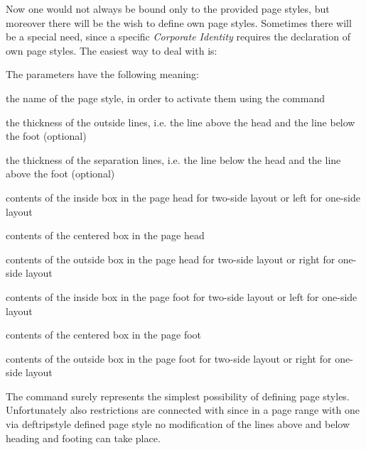 Now one would not always be bound only to the provided page styles,
but moreover there will be the wish to define own page styles.
Sometimes there will be a special need, since a specific
\emph{Corporate Identity} requires the declaration of own page styles.
The easiest way to deal with is:
\begin{Declaration}
%
%
%
\end{Declaration}%
The parameters have the following meaning:
\begin{labeling}[\,--]{}
\item[\PName{name}] the name of the page style, in order to activate them
        using the command 
\item[\PName{LO}] the thickness of the outside lines,
        i.e. the line above the head
        and the line below the foot (optional)
\item[\PName{LI}] the thickness of the separation lines,
        i.e. the line below the head
        and the line above the foot (optional)
\item[\PName{HI}] contents of the inside box in the page head for two-side
        layout or left for one-side layout
\item[\PName{HC}] contents of the centered box in the page head
\item[\PName{HO}] contents of the outside box in the page head for two-side
        layout or right for one-side layout
\item[\PName{FI}] contents of the inside box in the page foot for two-side
        layout or left for one-side layout
\item[\PName{FC}] contents of the centered box in the page foot
\item[\PName{FO}] contents of the outside box in the page foot for two-side
        layout or right for one-side layout
\end{labeling}

The command  surely represents the simplest
possibility of defining page styles.
Unfortunately also restrictions are connected with since in a
page range with one via deftripstyle defined page style
no modification of the lines above and below heading and footing
can take place.

